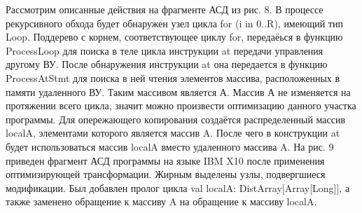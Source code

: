 Рассмотрим описанные действия на фрагменте АСД из рис. 8. В процессе рекурсивного обхода будет обнаружен узел цикла for (i in 0..R), имеющий тип Loop. Поддерево с корнем, соответствующее циклу for, передаёься в функцию ProcessLoop для поиска в теле цикла инструкции at передачи управления другому ВУ. После обнаружения инструкции at она передается в функцию ProcessAtStmt для поиска в ней чтения элементов массива, расположенных в памяти удаленного ВУ. Таким массивом является А. Массив А не изменяется на протяжении всего цикла, значит можно произвести оптимизацию данного участка программы. Для опережающего копирования создаётся распределенный массив localA, элементами которого является массив A. После чего в конструкции at будет использоваться массив localA вместо удаленного массива A. 
На рис. 9 приведен фрагмент АСД программы на языке IBM X10 после применения оптимизирующей трансформации. Жирным выделены узлы, подвергшиеся модификации. Был добавлен пролог цикла val localA: DistArray[Array[Long]], а также заменено обращение к массиву A на обращение к массиву localA. 












\clearpage
